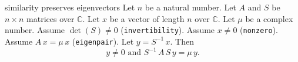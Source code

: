\begin{cleanresult}{similarity preserves eigenvectors}
Let $n$ be a natural number.
Let $A$ and $S$ be $n\times n$ matrices over $\mathbb{C}$.
Let $x$ be a vector of length $n$ over $\mathbb{C}$.
Let $\mu$ be a complex number.
Assume $\det(S) \ne 0$ (\texttt{invertibility}).
Assume $x \ne 0$ (\texttt{nonzero}).
Assume $A \, x = \mu \, x$ (\texttt{eigenpair}).
Let $y = {S}^{-1} \, x$.
Then \[y \ne 0 \text{ and } {S}^{-1} \, A \, S \, y = \mu \, y.\]
\par{}
\end{cleanresult}

